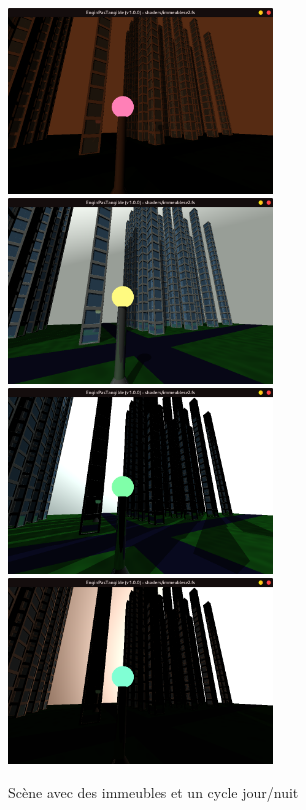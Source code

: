 \begin{figure}[h]
    \centering
    \includegraphics[width=7cm]{images/screens/ville1matin.png}
    \includegraphics[width=7cm]{images/screens/ville2jour.png}
    \includegraphics[width=7cm]{images/screens/ville3aprem.png}
    \includegraphics[width=7cm]{images/screens/ville4soir.png}
    \caption{Scène avec des immeubles et un cycle jour/nuit}
    \label{fig:city}
\end{figure}

